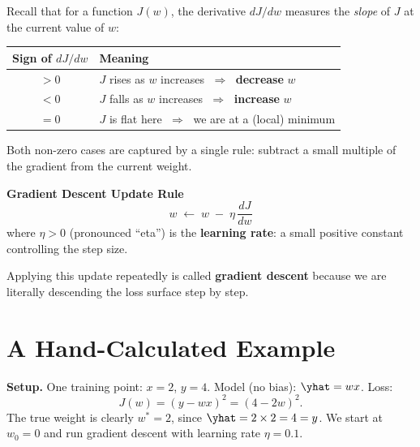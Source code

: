 \documentclass[12pt, a4paper]{article}
\begin{document}
Recall that for a function $J(w)$, the derivative $dJ/dw$ measures the
\emph{slope} of $J$ at the current value of $w$:

\begin{center}
  \renewcommand{\arraystretch}{1.3}
  \begin{tabular}{cl}
    \toprule
    Sign of $dJ/dw$ & Meaning                                                            \\
    \midrule
    $> 0$           & $J$ rises as $w$ increases $\;\Rightarrow\;$ \textbf{decrease} $w$ \\
    $< 0$           & $J$ falls as $w$ increases $\;\Rightarrow\;$ \textbf{increase} $w$ \\
    $= 0$           & $J$ is flat here $\;\Rightarrow\;$ we are at a (local) minimum     \\
    \bottomrule
  \end{tabular}
\end{center}

Both non-zero cases are captured by a single rule: subtract a small multiple
of the gradient from the current weight.

\begin{resultbox}
  \textbf{Gradient Descent Update Rule}
  \[
    w \;\longleftarrow\; w \;-\; \eta\,\frac{dJ}{dw}
  \]
  where $\eta > 0$ (pronounced ``eta'') is the \textbf{learning rate}: a small
  positive constant controlling the step size.
\end{resultbox}

Applying this update repeatedly is called \textbf{gradient descent} because
we are literally descending the loss surface step by step.

\section{A Hand-Calculated Example}

\begin{example}
  \textbf{Setup.}
  One training point: $x = 2$, $y = 4$.
  Model (no bias): $\yhat = wx$.
  Loss:
  \[
    J(w) = (y - wx)^2 = (4 - 2w)^2.
  \]
  The true weight is clearly $w^{*} = 2$, since $\yhat = 2 \times 2 = 4 = y$.
  We start at $w_0 = 0$ and run gradient descent with learning rate
  $\eta = 0.1$.
\end{example}

\end{document}
